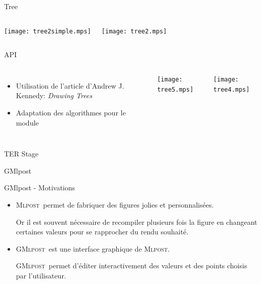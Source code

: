 \documentclass{beamer}
\newcommand{\mlpost}{\textsc{Mlpost}}
\newcommand{\gmlpost}{\textsc{GMlpost}}
\begin{document}
\begin{frame}{Tree}
  \begin{columns}
    \begin{center}
      \texttt{[image: tree2simple.mps]}
    \end{center}
    \begin{center}
      \texttt{[image: tree2.mps]}
    \end{center}
  \end{columns}
\end{frame}

\begin{frame}[fragile]{API}
  \begin{columns}
    \begin{itemize}
    \item Utilisation de l'article d'Andrew J. Kennedy: \textit{Drawing Trees}
    \item Adaptation des algorithmes pour le module
    \end{itemize}
    \texttt{[image: tree5.mps]}

    \bigskip
    \bigskip
    \texttt{[image: tree4.mps]}
    \end{columns}
\end{frame}

\begin{frame}{TER Stage}
  \begin{center}
    \Huge{GMlpost}
  \end{center}
\end{frame}

\begin{frame}{GMlpost - Motivations}
  \begin{itemize}
  \item<1-> \mlpost\ permet de fabriquer des figures jolies et personnalisées.
  
  \bigskip
  
  Or il est souvent nécessaire de recompiler plusieurs fois la figure en changeant certaines valeurs pour se rapprocher du rendu souhaité. 

\bigskip

  \item<2->  \gmlpost\ est une interface graphique de \mlpost.

    \bigskip

    \gmlpost\ permet d'éditer interactivement des valeurs et des points choisis par l'utilisateur.

  \end{itemize}
\end{frame}
\end{document}
